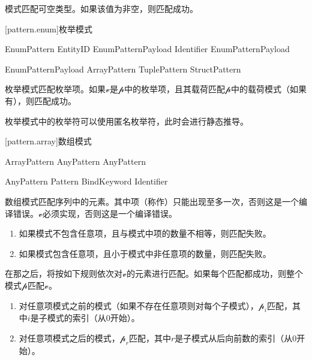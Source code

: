 \pnum
{}模式匹配可空类型。如果该值为非空，则匹配成功。

[pattern.enum]{枚举模式}

\begin{bnf}{EnumPattern}
    EntityID EnumPatternPayload\bnfq \br
     Identifier EnumPatternPayload\bnfq
\end{bnf}

\begin{bnf}{EnumPatternPayload}
    ArrayPattern \br
    TuplePattern \br
    StructPattern
\end{bnf}

\pnum
枚举模式匹配枚举项。如果$\mathcal{v}$是$\mathcal{p}$中的枚举项，且其载荷匹配$\mathcal{p}$中的载荷模式（如果有），则匹配成功。

\pnum
枚举模式中的枚举符可以使用匿名枚举符，此时会进行静态推导。

[pattern.array]{数组模式}

\begin{bnf}{ArrayPattern}
    \terminal{[} AnyPattern \bnflp\terminal{,} AnyPattern\bnfrp\bnfs\ \terminal{]}
\end{bnf}

\begin{bnf}{AnyPattern}
    Pattern\br
     \br
    BindKeyword  Identifier
\end{bnf}

\pnum
数组模式匹配序列中的元素。其中项（称作）只能出现至多一次，否则这是一个编译错误。$\mathcal{v}$必须实现，否则这是一个编译错误。

\begin{enumerate}
    \item 如果模式不包含任意项，且与模式中项的数量不相等，则匹配失败。
    \item 如果模式包含任意项，且小于模式中非任意项的数量，则匹配失败。
\end{enumerate}

\pnum
在那之后，将按如下规则依次对$\mathcal{v}$的元素进行匹配。如果每个匹配都成功，则整个模式$\mathcal{p}$匹配$\mathcal{v}$。

\begin{enumerate}
    \item 对任意项模式之前的模式（如果不存在任意项则对每个子模式），$\mathcal{p}_i$匹配，其中$i$是子模式的索引（从0开始）。
    \item 对任意项模式之后的模式，$\mathcal{p}_r$匹配，其中$r$是子模式从后向前数的索引（从0开始）。
\end{enumerate}

